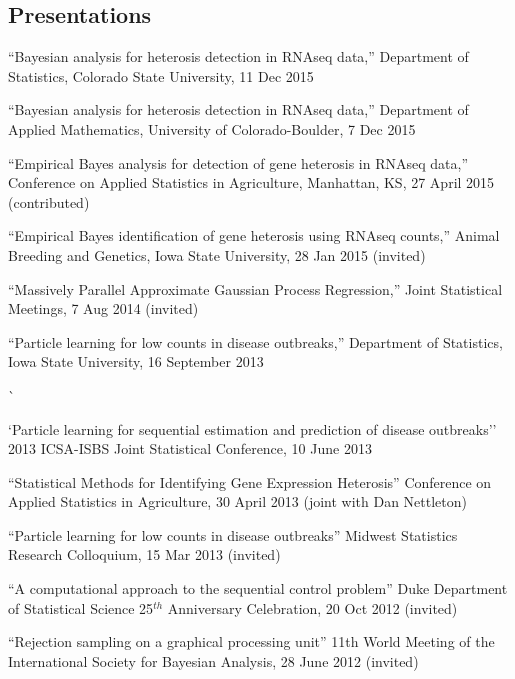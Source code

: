 \documentclass[overlapped,line]{res}
\begin{document}
\begin{resume}

\section{\bf Presentations}

%

{\small

``Bayesian analysis for heterosis detection in RNAseq data,'' Department of Statistics, Colorado State University, 11 Dec 2015

``Bayesian analysis for heterosis detection in RNAseq data,'' Department of Applied Mathematics, University of Colorado-Boulder, 7 Dec 2015

``Empirical Bayes analysis for detection of gene heterosis in RNAseq data,'' Conference on Applied Statistics in Agriculture, Manhattan, KS, 27 April 2015 (contributed)

``Empirical Bayes identification of gene heterosis using RNAseq counts,'' Animal Breeding and Genetics, Iowa State University, 28 Jan 2015 (invited)

``Massively Parallel Approximate Gaussian Process Regression,'' Joint Statistical Meetings, 7 Aug 2014 (invited)

``Particle learning for low counts in disease outbreaks,'' Department of Statistics, Iowa State University, 16 September 2013

\newpage \opening

``Particle learning for sequential estimation and prediction of disease outbreaks''  2013 ICSA-ISBS Joint Statistical Conference, 10 June 2013

``Statistical Methods for Identifying Gene Expression Heterosis'' Conference on Applied Statistics in Agriculture, 30 April 2013 (joint with Dan Nettleton)

``Particle learning for low counts in disease outbreaks'' Midwest Statistics Research Colloquium, 15 Mar 2013 (invited)

``A computational approach to the sequential control problem'' Duke Department of Statistical Science 25$^{th}$ Anniversary Celebration, 20 Oct 2012 (invited)

``Rejection sampling on a graphical processing unit'' 11th World Meeting of the International Society for Bayesian Analysis, 28 June 2012 (invited)

}
\end{resume}
\end{document}
